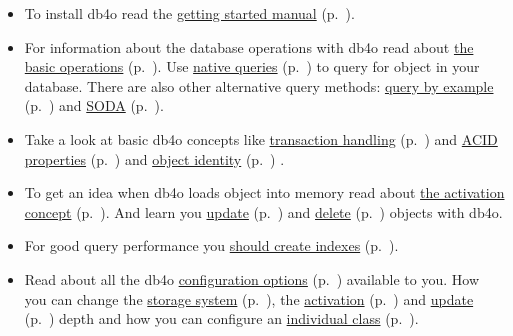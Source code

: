 \begin{itemize}
\item To install db4o read the \hyperref[ref:basics-getting-started]{getting started manual} (p.~\pageref{ref:basics-getting-started}).
\item For information about the database operations with db4o read about \hyperref[ref:basics-object-container]{the basic operations} (p.~\pageref{ref:basics-object-container}).  Use \hyperref[ref:basics-querying-native-queries]{native queries} (p.~\pageref{ref:basics-querying-native-queries}) to query for object in your database.  There are also other alternative query methods: \hyperref[ref:basics-querying-query-by-example]{query by example} (p.~\pageref{ref:basics-querying-query-by-example}) and \hyperref[ref:basics-querying-soda-query]{SODA} (p.~\pageref{ref:basics-querying-soda-query}).
\item Take a look at basic db4o concepts like \hyperref[ref:basics-acid-and-transactions-db4o-tx-basics]{transaction handling} (p.~\pageref{ref:basics-acid-and-transactions-db4o-tx-basics}) and \hyperref[ref:basics-acid-and-transactions]{ACID properties} (p.~\pageref{ref:basics-acid-and-transactions}) and \hyperref[ref:basics-identity-concept]{object identity} (p.~\pageref{ref:basics-identity-concept}) .
\item To get an idea when db4o loads object into memory read about \hyperref[ref:basics-activation]{the activation concept} (p.~\pageref{ref:basics-activation}). And learn you \hyperref[ref:basics-update-concept]{update} (p.~\pageref{ref:basics-update-concept}) and \hyperref[ref:basics-delete-behavior]{delete} (p.~\pageref{ref:basics-delete-behavior}) objects with db4o.
\item For good query performance you \hyperref[ref:basics-indexing]{should create indexes} (p.~\pageref{ref:basics-indexing}).
\item Read about all the db4o \hyperref[ref:configuration]{configuration options} (p.~\pageref{ref:configuration}) available to you. How you can change the \hyperref[ref:configuration-file-storage]{storage system} (p.~\pageref{ref:configuration-file-storage}), the \hyperref[ref:configuration-common-activation-depth]{activation} (p.~\pageref{ref:configuration-common-activation-depth}) and \hyperref[ref:configuration-common-update-depth]{update} (p.~\pageref{ref:configuration-common-update-depth}) depth and how you can configure an \hyperref[ref:configuration-objectclass-configuration]{individual class} (p.~\pageref{ref:configuration-objectclass-configuration}).

\end{itemize}
